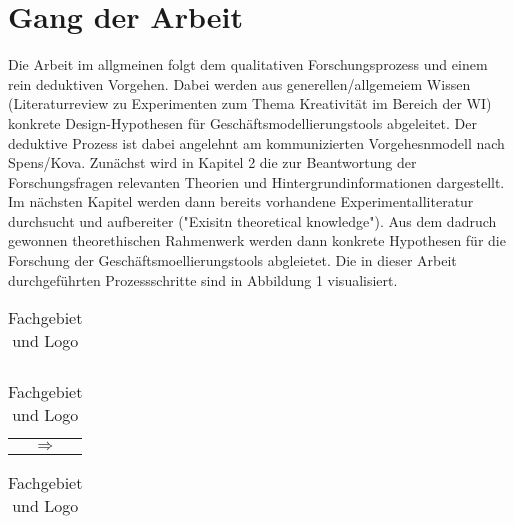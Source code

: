 \section{Gang der Arbeit}
Die Arbeit im allgmeinen folgt dem qualitativen Forschungsprozess und einem rein deduktiven Vorgehen. Dabei werden aus generellen/allgemeiem Wissen (Literaturreview zu Experimenten zum Thema Kreativität im Bereich der WI) konkrete Design-Hypothesen für Geschäftsmodellierungstools abgeleitet. Der deduktive Prozess ist dabei angelehnt am kommunizierten Vorgehesnmodell nach Spens/Kova.
Zunächst wird in Kapitel 2 die zur Beantwortung der Forschungsfragen relevanten Theorien und Hintergrundinformationen dargestellt. Im nächsten Kapitel werden dann bereits vorhandene Experimentalliteratur durchsucht und aufbereiter ("Exisitn theoretical knowledge"). Aus dem dadruch gewonnen theorethischen Rahmenwerk werden dann konkrete Hypothesen für die Forschung der Geschäftsmoellierungstools abgleietet. Die in dieser Arbeit durchgeführten Prozessschritte sind in Abbildung 1 visualisiert. 


\begin{table}[H]
\centering
\begin{subtable}[t]{0.4\linewidth}
\begin{tabular}{c}

\end{tabular}
\end{subtable}
\hfill
\begin{subtable}[t]{0.1\linewidth}
\begin{tabular}{c}
$\Longrightarrow$
\end{tabular}
\end{subtable}
\hfill
\begin{subtable}[t]{0.4\linewidth}
\begin{tabular}{c}

\end{tabular}
\end{subtable}

\caption{ Fachgebiet und Logo}
\end{table}

\begin{table}[H]
\centering
\caption{My Caption}
\label{tab: myLabel}
\end{table}